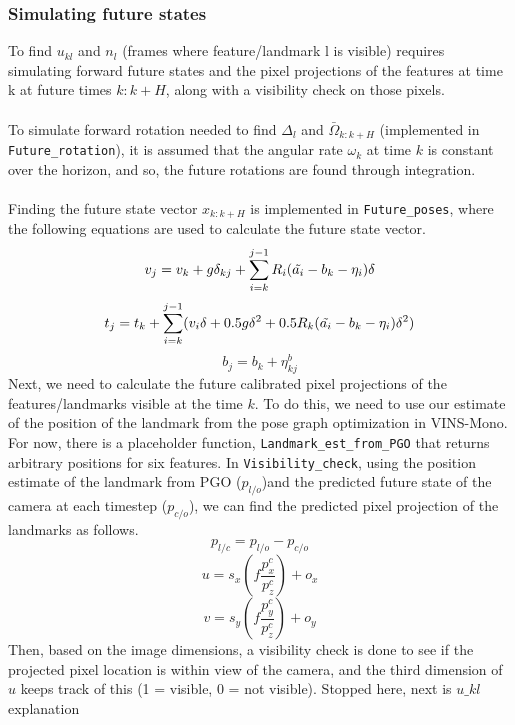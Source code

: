 \subsubsection{Simulating future states}
To find $u_{kl}$ and $n_l$ (frames where feature/landmark l is visible) requires simulating forward future states and the pixel projections of the features at time k at future times $k:k+H$, along with a visibility check on those pixels. \\ \\
To simulate forward rotation needed to find $\Delta_l$ and $ \bar{\Omega}_{k:k+H}$ (implemented in \texttt{Future\_rotation}), it is assumed that the angular rate $\omega_k$ at time $k$ is constant over the horizon, and so, the future rotations are found through integration.  \\ \\
Finding the future state vector $x_{k:k+H}$ is implemented in \texttt{Future\_poses}, where the following equations are used to calculate the future state vector. 
\begin{equation}
    v_j = v_k + g\delta_{kj} + \sum_{i=k}^{j-1} R_i(\Tilde{a_i} -b_k -\eta_i)\delta
\end{equation}
\begin{equation}
    t_j = t_k + \sum_{i=k}^{j-1} (v_i\delta+0.5g\delta^2+0.5R_k(\Tilde{a_i} -b_k -\eta_i)\delta^2)
\end{equation}
\begin{equation}
    b_j = b_k +\eta_{kj}^b
\end{equation}
Next, we need to calculate the future calibrated pixel projections of the features/landmarks visible at the time $k$. To do this, we need to use our estimate of the position of the landmark from the pose graph optimization in VINS-Mono. For now, there is a placeholder function, \texttt{Landmark\_est\_from\_PGO} that returns arbitrary positions for six features. In \texttt{Visibility\_check}, using the position estimate of the landmark from PGO ($p_{l/o}$)and the predicted future state of the camera at each timestep ($p_{c/o}$), we can find the predicted pixel projection of the landmarks as follows.
\begin{equation}
    p_{l/c} = p_{l/o} - p_{c/o}
\end{equation}
\begin{equation}
    u = s_x(f\frac{p_x^c}{p_z^c}) + o_x
\end{equation}
\begin{equation}
    v = s_y(f\frac{p_y^c}{p_z^c}) + o_y
\end{equation}
Then, based on the image dimensions, a visibility check is done to see if the projected pixel location is within view of the camera, and the third dimension of $u$ keeps track of this (1 = visible, 0 = not visible). 
Stopped here, next is $u\_{kl}$ explanation